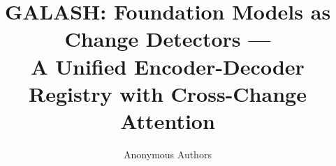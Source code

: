 \documentclass[10pt,a4paper]{article}
\title{GALASH: Foundation Models as Change Detectors --- \\
  A Unified Encoder-Decoder Registry with Cross-Change Attention}
\author{Anonymous Authors}
\begin{document}
\maketitle

\begin{abstract}
  
\end{abstract}








{\small
  
  
}
\end{document}

